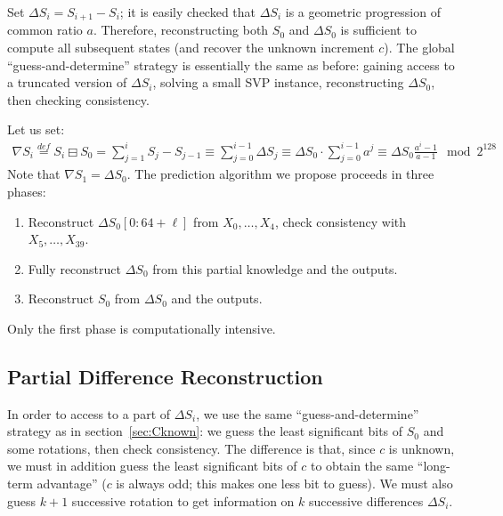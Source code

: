 \documentclass[preprint,svgnames]{iacrtrans}
\begin{document}

Set $\Delta S_i = S_{i+1} - S_i$; it is easily checked that $\Delta S_i$ is a
geometric progression of common ratio $a$. Therefore, reconstructing both $S_0$
and $\Delta S_0$ is sufficient to compute all subsequent states (and recover the
unknown increment $c$). The global ``guess-and-determine'' strategy is
essentially the same as before: gaining access to a truncated version of
$\Delta S_i$, solving a small SVP instance, reconstructing $\Delta S_0$, then
checking consistency.

Let us set:
\begin{align*}
  \nabla S_i \stackrel{def}{=} S_i \boxminus S_0 = \sum_{j=1}^i S_j - S_{j-1} \equiv \sum_{j=0}^{i-1} \Delta S_j \equiv \Delta S_0 \cdot \sum_{j=0}^{i-1} a^j \equiv \Delta S_0 \frac{a^i-1}{a-1} \mod 2^{128}
\end{align*}
Note that $\nabla S_1 = \Delta S_0$. The prediction algorithm we propose proceeds in three phases:
\begin{enumerate}
\item Reconstruct $\Delta S_0[0:64+\ell]$ from $X_0, \dots, X_{4}$, check consistency with $X_5, \dots, X_{39}$.
\item Fully reconstruct $\Delta S_0$ from this partial knowledge and the outputs.
\item Reconstruct $S_0$ from $\Delta S_0$ and the outputs.
\end{enumerate}

\noindent Only the first phase is computationally intensive. 

\subsection{Partial Difference Reconstruction}

In order to access to a part of $\Delta S_i$, we use the same
``guess-and-determine'' strategy as in section~\ref{sec:Cknown}: we guess the
least significant bits of $S_0$ and some rotations, then check consistency. The
difference is that, since $c$ is unknown, we must in addition guess the least
significant bits of $c$ to obtain the same ``long-term advantage'' ($c$ is
always odd; this makes one less bit to guess). We must also guess $k+1$
successive rotation to get information on $k$ successive differences
$\Delta S_i$.
\end{document}
